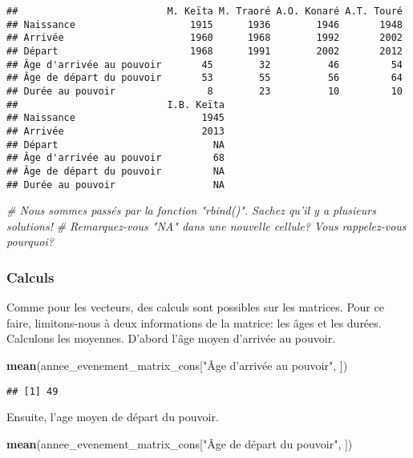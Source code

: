 \documentclass[]{book}
\newenvironment{Shaded}{\begin{snugshade}}{\end{snugshade}}
\newcommand{\KeywordTok}[1]{\textcolor[rgb]{0.13,0.29,0.53}{\textbf{#1}}}
\newcommand{\StringTok}[1]{\textcolor[rgb]{0.31,0.60,0.02}{#1}}
\newcommand{\CommentTok}[1]{\textcolor[rgb]{0.56,0.35,0.01}{\textit{#1}}}
\newcommand{\NormalTok}[1]{#1}
\begin{document}
\begin{verbatim}
##                          M. Keïta M. Traoré A.O. Konaré A.T. Touré
## Naissance                    1915      1936        1946       1948
## Arrivée                      1960      1968        1992       2002
## Départ                       1968      1991        2002       2012
## Âge d'arrivée au pouvoir       45        32          46         54
## Âge de départ du pouvoir       53        55          56         64
## Durée au pouvoir                8        23          10         10
##                          I.B. Keïta
## Naissance                      1945
## Arrivée                        2013
## Départ                           NA
## Âge d'arrivée au pouvoir         68
## Âge de départ du pouvoir         NA
## Durée au pouvoir                 NA
\end{verbatim}

\begin{Shaded}
\begin{Highlighting}[]
\CommentTok{# Nous sommes passés par la fonction "rbind()". Sachez qu'il y a plusieurs solutions!}
\CommentTok{# Remarquez-vous "NA" dans une nouvelle cellule? Vous rappelez-vous pourquoi?}
\end{Highlighting}
\end{Shaded}

\subsubsection{Calculs}\label{calculs}

Comme pour les vecteurs, des calculs sont possibles sur les matrices.
Pour ce faire, limitons-nous à deux informations de la matrice: les âges
et les durées. Calculons les moyennes. D'abord l'âge moyen d'arrivée au
pouvoir.

\begin{Shaded}
\begin{Highlighting}[]
\KeywordTok{mean}\NormalTok{(annee_evenement_matrix_cons[}\StringTok{"Âge d'arrivée au pouvoir"}\NormalTok{, ])}
\end{Highlighting}
\end{Shaded}

\begin{verbatim}
## [1] 49
\end{verbatim}

Ensuite, l'age moyen de départ du pouvoir.

\begin{Shaded}
\begin{Highlighting}[]
\KeywordTok{mean}\NormalTok{(annee_evenement_matrix_cons[}\StringTok{"Âge de départ du pouvoir"}\NormalTok{, ])}
\end{Highlighting}
\end{Shaded}
\end{document}
